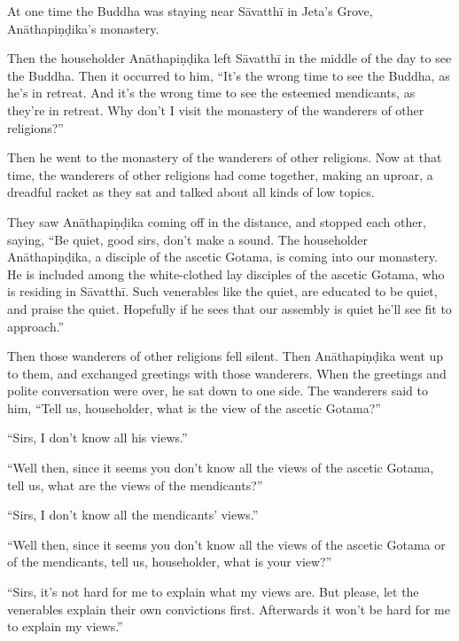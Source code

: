\documentclass[12pt,openany]{book}%
\begin{document}
At one time the Buddha was staying near \textsanskrit{Sāvatthī} in Jeta’s Grove, \textsanskrit{Anāthapiṇḍika}’s monastery. 

Then the householder \textsanskrit{Anāthapiṇḍika} left \textsanskrit{Sāvatthī} in the middle of the day to see the Buddha. Then it occurred to him, “It’s the wrong time to see the Buddha, as he’s in retreat. And it’s the wrong time to see the esteemed mendicants, as they’re in retreat. Why don’t I visit the monastery of the wanderers of other religions?” 

Then he went to the monastery of the wanderers of other religions. Now at that time, the wanderers of other religions had come together, making an uproar, a dreadful racket as they sat and talked about all kinds of low topics. 

They saw \textsanskrit{Anāthapiṇḍika} coming off in the distance, and stopped each other, saying, “Be quiet, good sirs, don’t make a sound. The householder \textsanskrit{Anāthapiṇḍika}, a disciple of the ascetic Gotama, is coming into our monastery. He is included among the white-clothed lay disciples of the ascetic Gotama, who is residing in \textsanskrit{Sāvatthī}. Such venerables like the quiet, are educated to be quiet, and praise the quiet. Hopefully if he sees that our assembly is quiet he’ll see fit to approach.” 

Then those wanderers of other religions fell silent. Then \textsanskrit{Anāthapiṇḍika} went up to them, and exchanged greetings with those wanderers. When the greetings and polite conversation were over, he sat down to one side. The wanderers said to him, “Tell us, householder, what is the view of the ascetic Gotama?” 

“Sirs, I don’t know all his views.” 

“Well then, since it seems you don’t know all the views of the ascetic Gotama, tell us, what are the views of the mendicants?” 

“Sirs, I don’t know all the mendicants’ views.” 

“Well then, since it seems you don’t know all the views of the ascetic Gotama or of the mendicants, tell us, householder, what is your view?” 

“Sirs, it’s not hard for me to explain what my views are. But please, let the venerables explain their own convictions first. Afterwards it won’t be hard for me to explain my views.” 
\end{document}
